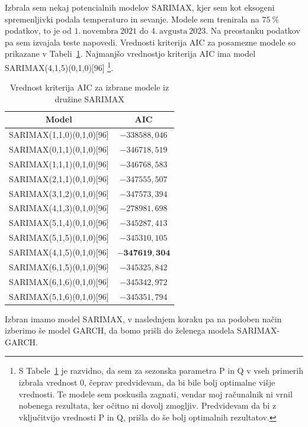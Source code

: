 \documentclass[a4paper, 11pt]{article}
\begin{document}
\noindent Izbrala sem nekaj potencialnih modelov SARIMAX, kjer sem kot eksogeni spremenljivki podala temperaturo in sevanje.
Modele sem trenirala na $75~\%$ podatkov, to je od $1.~\text{novembra}~2021$ do $4.~\text{avgusta}~2023$. Na preostanku podatkov 
pa sem izvajala teste napovedi. 
Vrednosti kriterija AIC za posamezne modele so prikazane v Tabeli~\ref{Tab:SARIMA_AIC}. 
Najmanjšo vrednostjo kriterija AIC ima model SARIMAX(4,1,5)(0,1,0)[96] \footnote{S Tabele~\ref{Tab:SARIMA_AIC} 
je razvidno, da sem za sezonska parametra P in Q v vseh primerih izbrala 
vrednost $0$, čeprav predvidevam, da bi bile bolj optimalne višje vrednosti. Te modele sem poskusila zagnati, 
vendar moj računalnik ni vrnil nobenega rezultata, ker očitno ni dovolj zmogljiv. Predvidevam da bi z 
vključitvijo vrednosti P in Q, prišla do še bolj optimalnih rezultatov.}. 

\begin{table}[!ht]
    \centering
    \caption{Vrednost kriterija AIC za izbrane modele iz družine SARIMAX}\par\medskip
    \label{Tab:SARIMA_AIC}
    \begin{tabular}{c|c}
        Model & AIC \\ \hline
        SARIMAX(1,1,0)(0,1,0)[96] & $-338588{,}046$ \\ 
        SARIMAX(0,1,1)(0,1,0)[96] & $-346718{,}519$ \\ 
        SARIMAX(1,1,1)(0,1,0)[96] & $-346768{,}583$ \\ 
        SARIMAX(2,1,1)(0,1,0)[96] & $-347555{,}507$ \\ 
        SARIMAX(3,1,2)(0,1,0)[96] & $-347573{,}394$ \\ 
        SARIMAX(4,1,3)(0,1,0)[96] & $-278981{,}698$ \\ 
        SARIMAX(5,1,4)(0,1,0)[96] & $-345287{,}413$ \\ 
        SARIMAX(5,1,5)(0,1,0)[96] & $-345310{,}105$ \\ 
        SARIMAX(4,1,5)(0,1,0)[96] & $\mathbf{-347619{,}304}$ \\ 
        SARIMAX(6,1,5)(0,1,0)[96] & $-345325{,}842$ \\ 
        SARIMAX(6,1,6)(0,1,0)[96] & $-345342{,}972$ \\ 
        SARIMAX(5,1,6)(0,1,0)[96] & $-345351{,}794$ \\
    \end{tabular}
\end{table}

\noindent Izbran imamo model SARIMAX, v naslednjem koraku pa na podoben način izberimo še model GARCH, da bomo
prišli do želenega modela SARIMAX-GARCH. 
\end{document}
